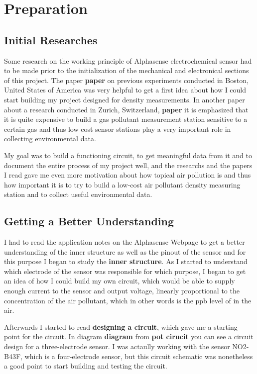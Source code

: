 \chapter{Preparation}
\label{sec:firststeps}

\section{Initial Researches}
Some research on the working principle of Alphasense  electrochemical sensor had to be made prior to the initialization of the mechanical and electronical sections of this project. The paper \textbf{paper} on previous experiments conducted in Boston, United States of America was very helpful to get a first idea about how I could start building my project designed for  density measurements. In another paper about a research conducted in Zurich, Switzerland, \textbf{paper} it is emphasized that it is quite expensive to build a gas pollutant measurement station sensitive to a certain gas and thus low cost sensor stations play a very important role in collecting environmental data. \par 
My goal was to build a functioning circuit, to get meaningful data from it and to document the entire process of my project well, and the researchs and the papers I read gave me even more motivation about how topical air pollution is and thus how important it is to try to build a low-cost air pollutant density measuring station and to collect useful environmental data.

\section{Getting a Better Understanding}
I had to read the application notes on the Alphasense Webpage to get a better understanding of the inner structure as well as the pinout of the sensor and for this purpose I began to study the \textbf{inner structure}. As I started to understand which electrode of the sensor was responsible for which purpose, I began to get an idea of how I could build my own circuit, which would be able to supply enough current to the sensor and output voltage, linearly proportional to the concentration of the air pollutant, which in other words is the ppb level of  in the air. \par
Afterwards I started to read \textbf{designing a circuit}, which gave me a starting point for the circuit. In diagram \textbf{diagram} from \textbf{pot cirucit} you can see a circuit design for a three-electrode sensor. I was actaully working with the sensor NO2-B43F, which is a four-electrode sensor, but this circuit schematic was nonetheless a good point to start building and testing the circuit.

